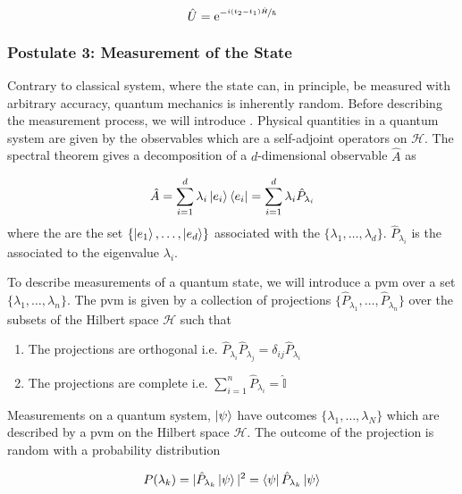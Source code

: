 \begin{equation}
	\hat{U} = \mathrm{e}^{-\nicefrac{i(t_2 - t_1)\hat{H}}{\hbar}}
\end{equation}

\subsubsection*{Postulate 3: Measurement of the State}

Contrary to classical system, where the state can, in principle, be measured with arbitrary accuracy, quantum mechanics is inherently random. Before describing the measurement process, we will introduce . Physical quantities in a quantum system are given by the observables which are a self-adjoint operators on $\mathcal{H}$. The spectral theorem gives a decomposition of a $d$-dimensional observable $\hat{A}$ as 

\begin{equation}
	\hat{A} = \sum_{i=1}^d \lambda_i \ket{e_i}\bra{e_i} = \sum_{i=1}^d \lambda_i \hat{P}_{\lambda_i}
\end{equation}
where the  are the set $\{\ket{e_1},\ldots ,\ket{e_d}\}$ associated with the  $\{\lambda_1,\ldots ,\lambda_d\}$. $\hat{P}_{\lambda_i}$ is the  associated to the eigenvalue $\lambda_i$.

To describe measurements of a quantum state, we will introduce a \ac{pvm} over a set $\{\lambda_1, \ldots, \lambda_n\}$. The \ac{pvm} is given by a collection of projections $\{\hat{P}_{\lambda_1},\ldots,\hat{P}_{\lambda_n}\}$ over the subsets of the Hilbert space $\mathcal{H}$ such that

\begin{enumerate}
	\item The projections are orthogonal i.e. $\hat{P}_{\lambda_i}\hat{P}_{\lambda_j} = \delta_{ij}\hat{P}_{\lambda_i}$
	\item The projections are complete i.e. $\sum_{i=1}^n \hat{P}_{\lambda_i} = \hat{\mathbb{I}}$
\end{enumerate}

Measurements on a quantum system, $\ket{\psi}$ have outcomes $\{\lambda_1, \ldots, \lambda_N\}$ which are described by a \ac{pvm} on the Hilbert space $\mathcal{H}$. The outcome of the projection is random with a probability distribution

\begin{equation}
	P(\lambda_k) = |\hat{P}_{\lambda_k}\ket{\psi}|^2 = \bra{\psi}\hat{P}_{\lambda_k}\ket{\psi}
\end{equation}

